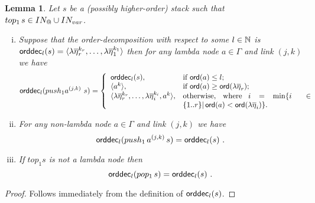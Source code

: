\documentclass[a4paper]{article}
\newtheorem{lemma}{Lemma}[section]
\theoremstyle{remark}
\theoremstyle{definition}
\newcommand\orddec{{\sf orddec}}
\newcommand\INodes{IN}%
\begin{document}
\begin{lemma}
\label{lem:push1pop1_orderdecompo} Let $s$ be a (possibly higher-order) stack
such that $top_1\,s \in \INodes_@ \union \INodes_{var}$.
\begin{enumerate}[i.]
\item Suppose that the order-decomposition with respect to some $l\in\mathbb{N}$ is $\orddec_l(s) = \langle \lambda
\overline{\eta}_r^{k_r}, \ldots, \lambda \overline{\eta}_1^{k_1}
\rangle$ then for any lambda node $a \in \Gamma$ and link $(j,k)$ we have
 $$ \orddec_l(push_1 a^{(j,k)}~s) = \left\{
                                       \begin{array}{ll}
\orddec_l(s), &\hbox{if $\ord{a}\leq l$;} \\
                                        \langle a^k \rangle, &  \hbox{if $\ord{a} \geq \ord{\lambda \overline{\eta}_r}$}; \\
                                         \langle \lambda \overline{\eta}_r^{k_r}, \ldots, \lambda
\overline{\eta}_i^{k_i}, a^k \rangle, & \parbox[t]{6cm}{otherwise, where $i = \min \{ i \ \in \{1..r\}| \, \ord{a} <
\ord{\lambda \overline{\eta}_i} \}$.}
                                       \end{array}
                                     \right.$$

\item For any non-lambda node $a \in \Gamma$ and link $(j,k)$ we have
$$ \orddec_l(push_1\,a^{(j,k)}\,s) = \orddec_l(s) \ .$$

\item If $top_1 s$ is not a lambda node then
$$ \orddec_l(pop_1\,s) = \orddec_l(s) \ .$$
\end{enumerate}
\end{lemma}
\begin{proof}
Follows immediately from the definition of  $\orddec_l(s)$.
\end{proof}
\end{document}

